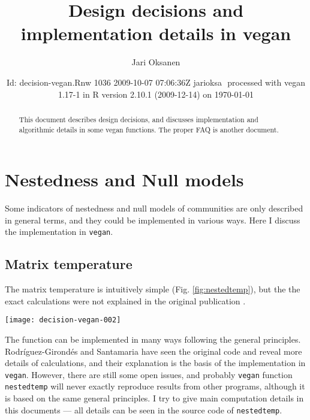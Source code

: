 \documentclass[a4paper,10pt]{amsart}
\author{Jari Oksanen}
\title{Design decisions and implementation details in vegan}
\date{$ $Id: decision-vegan.Rnw 1036 2009-10-07 07:06:36Z jarioksa $ $
  processed with vegan
1.17-1
in R version 2.10.1 (2009-12-14) on \today}
\begin{document}

\maketitle

\begin{abstract}

\noindent This document describes design decisions, and discusses implementation
and algorithmic details in some vegan functions. The proper FAQ is
another document.

\end{abstract}

\tableofcontents

\section{Nestedness and Null models}

Some indicators of nestedness and null models of communities are only
described in general terms, and they could be implemented in various
ways. Here I discuss the implementation in \texttt{vegan}.

\subsection{Matrix temperature}

The matrix temperature is intuitively simple
(Fig. \ref{fig:nestedtemp}), but the the exact calculations were not
explained in the original publication \cite{AtmarPat93}.
\begin{SCfigure}
\texttt{[image: decision-vegan-002]}
\label{fig:nestedtemp}
\caption{Matrix temperature for \emph{Falco subbuteo} on island 1
  (dot; Sibbo Svartholmen). The curve is the fill line, and in a cold
  matrix, all presences (red squares) should be in the upper left
  corner behind the fill line. Dashed diagonal line of length $D$ goes
  through the point, and an arrow of length $d$ connects the point to
  the fill line. The ``surprise'' for this point is $u = (d/D)^2$ and
  the matrix temperature is based on the sum of surprises: presences
  outside the fill line or absences within the fill line.}
\end{SCfigure}
The function can be implemented in many ways following the general
principles.  Rodr{\'i}guez-Girond{\'e}s and Santamaria \cite{RodGir06}
have seen the original code and reveal more details of calculations,
and their explanation is the basis of the implementation in
\texttt{vegan}.  However, there are still some open issues, and
probably \texttt{vegan} function \texttt{nestedtemp} will never
exactly reproduce results from other programs, although it is based on
the same general principles. I try to give main computation details in
this documents --- all details can be seen in the source code of
\texttt{nestedtemp}.
\end{document}
